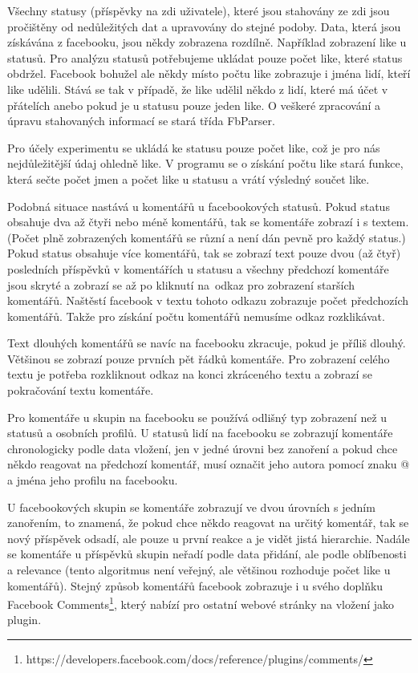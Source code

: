\documentclass[thesis=M,czech]{FITthesis}[2013/05/10]
\begin{document}
Všechny statusy (příspěvky na zdi uživatele), které jsou stahovány ze zdi jsou pročištěny od nedůležitých dat a upravovány do stejné podoby. Data, která jsou získávána z facebooku, jsou někdy zobrazena rozdílně. Například zobrazení like u statusů. Pro analýzu statusů potřebujeme ukládat pouze počet like, které status obdržel. Facebook bohužel ale někdy místo počtu like zobrazuje i jména lidí, kteří like udělili. Stává se tak v případě, že like udělil někdo z lidí, které má účet v přátelích anebo pokud je u statusu pouze jeden like. O veškeré zpracování a úpravu stahovaných informací se stará třída FbParser.

Pro účely experimentu se ukládá ke statusu pouze počet like, což je pro nás nejdůležitější údaj ohledně like. V programu se o získání počtu like stará funkce, která sečte počet jmen a počet like u statusu a vrátí výsledný součet like. 

Podobná situace nastává u komentářů u facebookových statusů. Pokud status obsahuje dva až čtyři nebo méně komentářů, tak se komentáře zobrazí i s textem. (Počet plně zobrazených komentářů se různí a není dán pevně pro každý status.) Pokud status obsahuje  více komentářů, tak se zobrazí text pouze dvou (až čtyř) posledních příspěvků v komentářích u statusu a všechny předchozí komentáře jsou skryté a zobrazí se až po kliknutí na~odkaz pro zobrazení starších komentářů. Naštěstí facebook v textu tohoto odkazu zobrazuje počet předchozích komentářů. Takže pro získání počtu komentářů nemusíme odkaz rozklikávat. 

Text dlouhých komentářů se navíc na facebooku zkracuje, pokud je příliš dlouhý. Většinou se zobrazí pouze prvních pět řádků komentáře. Pro zobrazení celého textu je potřeba rozkliknout odkaz na konci zkráceného textu a zobrazí se pokračování textu komentáře. 

Pro komentáře u skupin na facebooku se používá odlišný typ zobrazení než u statusů a osobních profilů. U statusů lidí na facebooku se zobrazují komentáře chronologicky podle data vložení, jen v jedné úrovni bez zanoření a pokud chce někdo reagovat na předchozí komentář, musí označit jeho autora pomocí znaku @ a jména jeho profilu na facebooku. 

U facebookových skupin se komentáře zobrazují ve dvou úrovních s jedním zanořením, to znamená, že pokud chce někdo reagovat na určitý komentář, tak se nový příspěvek odsadí, ale pouze u první reakce a je vidět jistá hierarchie. Nadále se komentáře u příspěvků skupin neřadí podle data přidání, ale podle oblíbenosti a relevance (tento algoritmus není veřejný, ale většinou rozhoduje počet like u komentářů). Stejný způsob komentářů facebook zobrazuje i u svého doplňku Facebook Comments\footnote{https://developers.facebook.com/docs/reference/plugins/comments/}, který nabízí pro ostatní webové stránky na vložení jako plugin. 
\end{document}
